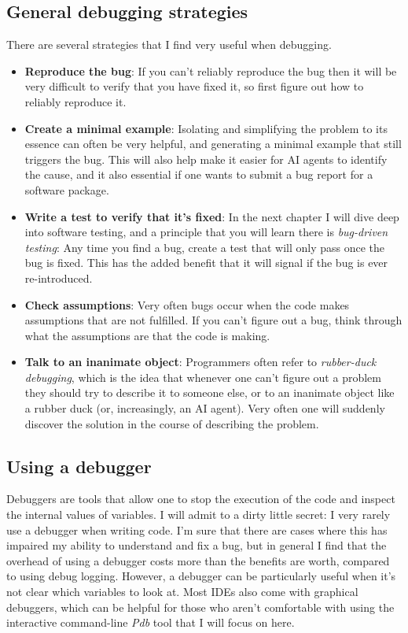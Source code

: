 \subsection{General debugging strategies}

There are several strategies that I find very useful when debugging.

\begin{itemize}
\item \textbf{Reproduce the bug}: If you can't reliably reproduce the bug then it will be very difficult to verify that you have fixed it, so first figure out how to reliably reproduce it.
\item \textbf{Create a minimal example}: Isolating and simplifying the problem to its essence can often be very helpful, and generating a minimal example that still triggers the bug.  This will also help make it easier for AI agents to identify the cause, and it also essential if one wants to submit a bug report for a software package.
\item \textbf{Write a test to verify that it's fixed}: In the next chapter I will dive deep into software testing, and a principle that you will learn there is \textit{bug-driven testing}: Any time you find a bug, create a test that will only pass once the bug is fixed. This has the added benefit that it will signal if the bug is ever re-introduced.
\item \textbf{Check assumptions}: Very often bugs occur when the code makes assumptions that are not fulfilled.  If you can't figure out a bug, think through what the assumptions are that the code is making.
\item \textbf{Talk to an inanimate object}: Programmers often refer to \textit{rubber-duck debugging}, which is the idea that whenever one can't figure out a problem they should try to describe it to someone else, or to an inanimate object like a rubber duck (or, increasingly, an AI agent). Very often one will suddenly discover the solution in the course of describing the problem.
\end{itemize}

\subsection{Using a debugger}

Debuggers are tools that allow one to stop the execution of the code and inspect the internal values of variables.  I will admit to a dirty little secret: I very rarely use a debugger when writing code.  I'm sure that there are cases where this has impaired my ability to understand and fix a bug, but in general I find that the overhead of using a debugger costs more than the benefits are worth, compared to using debug logging.  However, a debugger can be particularly useful when it's not clear which variables to look at. Most IDEs also come with graphical debuggers, which can be helpful for those who aren't comfortable with using the interactive command-line \textit{Pdb} tool that I will focus on here.

